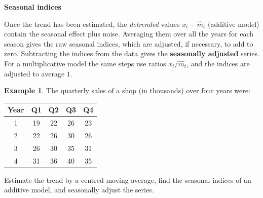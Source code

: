 \documentclass[11pt,a4paper]{article}
\theoremstyle{definition}
\newtheorem{exa}[thm]{Example}
\newcommand{\subhead}[1]{%
  \par\medskip\noindent\textbf{#1}\par\nobreak\smallskip}
\begin{document}
\subhead{Seasonal indices}
Once the trend has been estimated, the \emph{detrended} values $x_t - \hat m_t$ (additive model) contain the seasonal
effect plus noise. Averaging them over all the years for each season gives the raw seasonal indices, which
are adjusted, if necessary, to add to zero. Subtracting the indices from the data gives the \textbf{seasonally
adjusted} series. For a multiplicative model the same steps use ratios $x_t/\hat m_t$, and the indices are adjusted to
average $1$.

\begin{exa}\label{exa:quarterly}
The quarterly sales of a shop (in thousands) over four years were:
\begin{center}
\begin{tabular}{c|cccc}
Year & Q1 & Q2 & Q3 & Q4 \\
\hline
1 & 19 & 22 & 26 & 23 \\
2 & 22 & 26 & 30 & 26 \\
3 & 26 & 30 & 35 & 31 \\
4 & 31 & 36 & 40 & 35 \\
\end{tabular}
\end{center}
Estimate the trend by a centred moving average, find the seasonal indices of an additive model, and
seasonally adjust the series.
\end{exa}
\end{document}
